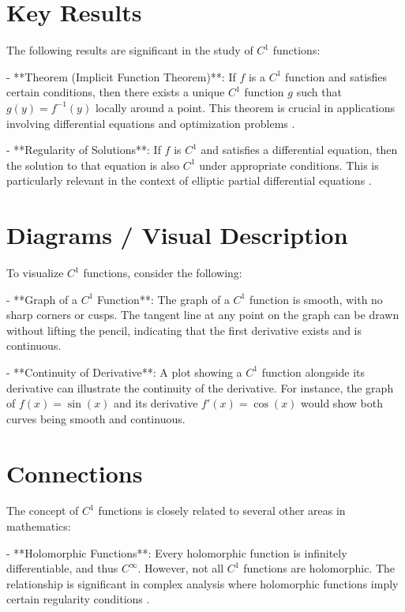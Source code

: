 \documentclass[11pt,a4paper]{article}
\begin{document}
\section{Key Results}
The following results are significant in the study of \( C^1 \) functions:

- **Theorem (Implicit Function Theorem)**: If \( f \) is a \( C^1 \) function and satisfies certain conditions, then there exists a unique \( C^1 \) function \( g \) such that \( g(y) = f^{-1}(y) \) locally around a point. This theorem is crucial in applications involving differential equations and optimization problems \cite{arxiv:2602.19251}.

- **Regularity of Solutions**: If \( f \) is \( C^1 \) and satisfies a differential equation, then the solution to that equation is also \( C^1 \) under appropriate conditions. This is particularly relevant in the context of elliptic partial differential equations \cite{arxiv:2601.19274}.

\section{Diagrams / Visual Description}
To visualize \( C^1 \) functions, consider the following:

- **Graph of a \( C^1 \) Function**: The graph of a \( C^1 \) function is smooth, with no sharp corners or cusps. The tangent line at any point on the graph can be drawn without lifting the pencil, indicating that the first derivative exists and is continuous.

- **Continuity of Derivative**: A plot showing a \( C^1 \) function alongside its derivative can illustrate the continuity of the derivative. For instance, the graph of \( f(x) = \sin(x) \) and its derivative \( f'(x) = \cos(x) \) would show both curves being smooth and continuous.

\section{Connections}
The concept of \( C^1 \) functions is closely related to several other areas in mathematics:

- **Holomorphic Functions**: Every holomorphic function is infinitely differentiable, and thus \( C^\infty \). However, not all \( C^1 \) functions are holomorphic. The relationship is significant in complex analysis where holomorphic functions imply certain regularity conditions \cite{arxiv:2602.19251}.
\end{document}
